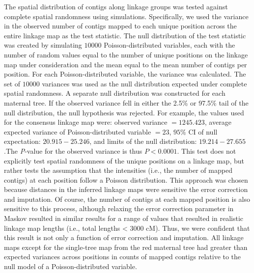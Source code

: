 \documentclass[smallextended]{svjour3}
\begin{document}
The spatial distribution of contigs along linkage groups was tested against complete spatial randomness using simulations.
Specifically, we used the variance in the observed number of contigs mapped to each unique position across the entire linkage map
as the test statistic. The null distribution of the test statistic was created by simulating $10000$ Poisson-distributed variables, each 
with the number of random values equal to the number of unique positions on the linkage map under consideration and the mean 
equal to the mean number of contigs per position. For each Poisson-distributed variable, the variance was calculated. The set of
$10000$ variances was used as the null distribution expected under complete spatial randomness. A separate null distribution was
constructed for each maternal tree. If the observed variance fell in either the 2.5\% or 97.5\% tail of the null distribution, the null
hypothesis was rejected. For example, the values used 
for the consensus linkage map were: observed variance $= 1245.423$, average expected variance of Poisson-distributed variable $= 
23$, $95\%$ CI of null expectation: $20.915 - 25.246$, and limits of the null distribution: $19.214 - 27.655$.The \textit{P}-value for
the observed variance is thus $P < 0.0001$. This test does not explicitly test spatial randomness of the unique positions on a linkage
map, but rather tests the assumption that the intensities (i.e., the number of mapped contigs) at each position follow a Poisson distribution. 
This approach was chosen because distances in the inferred linkage maps were sensitive the error correction and imputation. Of course, 
the number of contigs at each mapped position is also sensitive to this process, although relaxing the error correction parameter in
Maskov resulted in similar results for a range of values that resulted in realistic linkage map lengths (i.e., total lengths < $3000$ cM). Thus, we were confident that this
result is not only a function of error correction and imputation. All linkage maps except for the single-tree map from the red maternal tree
had greater than expected variances across positions in counts of mapped contigs relative to the null model of a Poisson-distributed variable.
\end{document}
